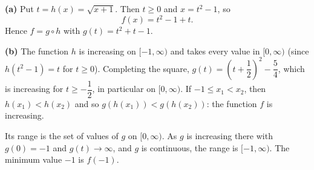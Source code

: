 \textbf{(a)} Put $t=h(x)=\sqrt{x+1}$. Then $t\ge0$ and $x=t^2-1$, so
\[
f(x)=t^2-1+t .
\]
Hence $f=g\circ h$ with $\boxed{g(t)=t^2+t-1}$.

\textbf{(b)} The function $h$ is increasing on $[-1,\infty)$ and takes every value in $[0,\infty)$ (since $h(t^2-1)=t$ for $t\ge0$). Completing the square, $g(t)=\left(t+\dfrac{1}{2}\right)^2-\dfrac{5}{4}$, which is increasing for $t\ge-\dfrac{1}{2}$, in particular on $[0,\infty)$. If $-1\le x_1<x_2$, then $h(x_1)<h(x_2)$ and so $g(h(x_1))<g(h(x_2))$: the function $f$ is increasing.

Its range is the set of values of $g$ on $[0,\infty)$. As $g$ is increasing there with $g(0)=-1$ and $g(t)\to\infty$, and $g$ is continuous, the range is $\boxed{[-1,\infty)}$. The minimum value $-1$ is $f(-1)$.
